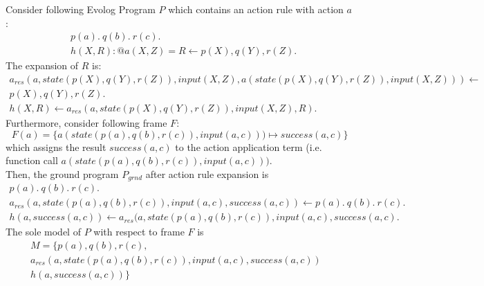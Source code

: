 \begin{example}
\label{ex:action-rule-expansion}
Consider following Evolog Program $P$ which contains an action rule with action $a$:
\begin{align*}
	&p(a).~q(b).~r(c). \\
	&h(X, R) : @a(X, Z) = R \leftarrow p(X), q(Y), r(Z).
\end{align*}
The expansion of $R$ is:
\begin{align*}
	a_{res}(a, \mathit{state}(p(X), q(Y), r(Z)), \mathit{input}(X, Z), a(\mathit{state}(p(X), q(Y), r(Z)), \mathit{input}(X, Z))) \leftarrow& \\
	p(X), q(Y), r(Z).& \\
	h(X, R) \leftarrow a_{res}(a, \mathit{state}(p(X), q(Y), r(Z)), \mathit{input}(X, Z), R).&
\end{align*}
Furthermore, consider following frame $F$:
\[
	F(a) = \{a(\mathit{state}(p(a), q(b), r(c)), \mathit{input}(a, c))) \mapsto \mathit{success}(a, c)\}
\]
which assigns the result $\mathit{success}(a, c)$ to the action application term (i.e. function call $a(\mathit{state}(p(a), q(b), r(c)), \mathit{input}(a, c)))$. \\

Then, the ground program $P_{grnd}$ after action rule expansion is
\begin{align*}
	p(a).~q(b).~r(c).& \\
	a_{res}(a, \mathit{state}(p(a), q(b), r(c)), \mathit{input}(a, c), \mathit{success}(a, c)) \leftarrow p(a).~q(b).~r(c).& \\
	h(a, \mathit{success}(a, c)) \leftarrow a_{res}(a, \mathit{state}(p(a), q(b), r(c)), \mathit{input}(a, c), \mathit{success}(a, c).&
\end{align*}
The sole model of $P$ with respect to frame $F$ is 
\begin{align*}
	M = \{p(a), q(b), r(c),& \\
	a_{res}(a, \mathit{state}(p(a), q(b), r(c)), \mathit{input}(a, c), \mathit{success}(a, c))& \\ h(a, \mathit{success}(a, c))\}&
\end{align*}
\end{example}